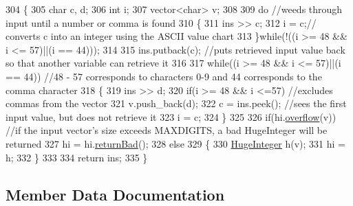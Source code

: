 \begin{DoxyCode}
304 \{
305    \textcolor{keywordtype}{char} c, d;
306    \textcolor{keywordtype}{int} i;
307    vector<char> v;
308 
309    \textcolor{keywordflow}{do} \textcolor{comment}{//weeds through input until a number or comma is found                                               
                                                                                                       }
310    \{
311       ins >> c;
312       i = c;\textcolor{comment}{// converts c into an integer using the ASCII value chart                                      
                                                                                                       }
313    \}\textcolor{keywordflow}{while}(!((i >= 48 && i <= 57)||(i == 44)));
314 
315    ins.putback(c); \textcolor{comment}{//puts retrieved input value back so that another variable can retrieve it              
                                                                                                       }
316 
317    \textcolor{keywordflow}{while}((i >= 48 && i <= 57)||(i == 44)) \textcolor{comment}{//48 - 57 corresponds to characters 0-9 and 44 corresponds to the
       comma character                                                                                 }
318    \{
319       ins >> d;
320       \textcolor{keywordflow}{if}(i >= 48 && i <=57) \textcolor{comment}{//excludes commas from the vector                                              
                                                                                                       }
321          v.push\_back(d);
322       c = ins.peek(); \textcolor{comment}{//sees the first input value, but does not retrieve it                               
                                                                                                       }
323       i = c;
324    \}
325 
326    \textcolor{keywordflow}{if}(hi.\hyperlink{classHugeInteger_a714314b2e1b79827d8796d8c52016e5a}{overflow}(v)) \textcolor{comment}{//if the input vector's size exceeds MAXDIGITS, a bad HugeInteger will be
       returned                                                                                                    }
327       hi = hi.\hyperlink{classHugeInteger_a6d9c7e76adbd02057a8a4a1048e05870}{returnBad}();
328    \textcolor{keywordflow}{else}
329    \{
330       \hyperlink{classHugeInteger}{HugeInteger} h(v);
331       hi = h;
332    \}
333 
334    \textcolor{keywordflow}{return} ins;
335 \}
\end{DoxyCode}


\subsection{Member Data Documentation}
